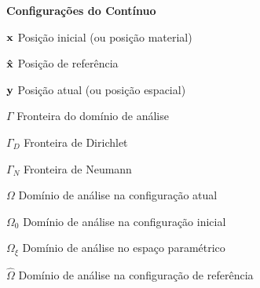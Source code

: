 \begin{simbolos}
    \item[\textbf{Configurações do Contínuo}]
    \item[$\mathbf{x}$] Posição inicial (ou posição material)
    \item[$\mathbf{\hat{x}}$] Posição de referência
    \item[$\mathbf{y}$] Posição atual (ou posição espacial)
    \item[$\Gamma$] Fronteira do domínio de análise
    \item[$\Gamma_D$] Fronteira de Dirichlet
    \item[$\Gamma_N$] Fronteira de Neumann
    \item[$\Omega$] Domínio de análise na configuração atual
    \item[$\Omega_0$] Domínio de análise na configuração inicial
    \item[$\Omega_\xi$] Domínio de análise no espaço paramétrico
    \item[$\hat{\Omega}$] Domínio de análise na configuração de referência


\end{simbolos}
